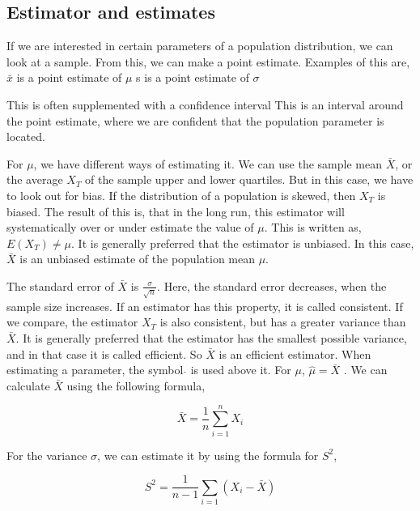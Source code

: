 \subsection{Estimator and estimates}
If we are interested in certain parameters of a population distribution, we can look at a sample. From this, we can make a point estimate. 
\newline
Examples of this are, 
\newline
$\bar{x}$ is a point estimate of $\mu$
\newline
s is a point estimate of $\sigma$
\newline

\noindent This is often supplemented with a confidence interval
\newline
This is an interval around the point estimate, where we are confident that the population parameter is located.
\newline

\noindent For $\mu$, we have different ways of estimating it. We can use the sample mean $\bar{X}$, or the average $X_T$ of the sample upper and lower quartiles. 
But in this case, we have to look out for bias. If the distribution of a population is skewed, then $X_T$ is biased. The result of this is, that in the long run, this estimator will systematically over or under estimate the value of $\mu$. This is written as,
\newline
$E(X_T) \neq \mu$.
\newline
It is generally preferred that the estimator is unbiased. In this case, $\bar{X}$ is an unbiased estimate of the population mean $\mu$.
\newline

\noindent The standard error of $\bar{X}$ is $\frac{\sigma}{\sqrt{n}}$. Here, the standard error decreases, when the sample size increases. If an estimator has this property, it is called consistent. If we compare, the estimator $X_T$ is also consistent, but has a greater variance than $\bar{X}$. 
\newline
It is generally preferred that the estimator has the smallest possible variance, and in that case it is called efficient. So $\bar{X}$ is an efficient estimator.
\newline
When estimating a parameter, the symbol $\hat{}$ is used above it. For $\mu$, $\hat{\mu} = \bar{X}$ .
\newline
We can calculate $\bar{X}$ using the following formula,

\begin{equation}
	\bar{X}=\frac{1}{n} \sum_{i=1}^{n}X_i
\end{equation}


\noindent For the variance $\sigma$, we can estimate it by using the formula for $S^2$,

\begin{equation}
	S^2=\frac{1}{n-1} \sum_{i=1}(X_i-\bar{X})
\end{equation}
